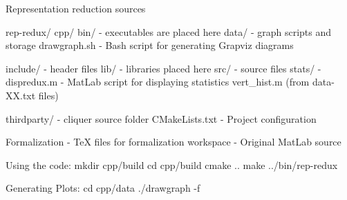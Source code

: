 Representation reduction sources

rep-redux/
	cpp/
		bin/			- executables are placed here
		data/			- graph scripts and storage
			drawgraph.sh		- Bash script for generating Grapviz diagrams

		include/		- header files
		lib/			- libraries placed here
		src/			- source files
		stats/			- 
			dispredux.m		- MatLab script for displaying statistics
			vert_hist.m			(from data-XX.txt files)	

		thirdparty/		- cliquer source folder
		CMakeLists.txt		- Project configuration

	Formalization		- TeX files for formalization
	workspace		- Original MatLab source


Using the code:
	mkdir cpp/build
	cd cpp/build
	cmake ..
	make
	../bin/rep-redux

Generating Plots:
	cd cpp/data
	./drawgraph -f
